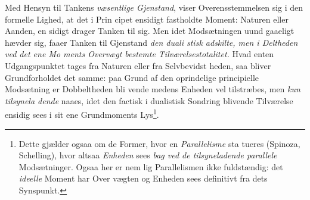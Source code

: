 Med Hensyn til Tankens \emph{væsentlige Gjenstand}, viser
Overensstemmelsen sig i den formelle Lighed, at det i Prin\-%
cipet ensidigt fastholdte Moment: Naturen eller Aanden, en\-%
sidigt drager Tanken til sig. Men idet Modsætningen uund\-%
gaaeligt hævder sig, faaer Tanken til Gjenstand \emph{den duali\-%
\setcounter{footnote}{0}%
stisk adskilte, men i Deltheden ved det ene Mo\-%
ments Overvægt bestemte Tilværelsestotalitet.} Hvad
enten Udgangspunktet tages fra Naturen eller fra Selvbevidst\-%
heden, saa bliver Grundforholdet det samme: paa Grund af
den oprindelige principielle Modsætning er Dobbeltheden bli\-%
vende medens Enheden vel tilstræbes, men \emph{kun tilsynela\-%
dende} naaes, idet den factisk i dualistisk Sondring blivende
Tilværelse ensidig sees i sit ene Grundmoments Lys\footnote{Dette gjælder ogsaa om de Former, hvor en \emph{Parallelisme} sta\-%
tueres (Spinoza, Schelling), hvor altsaa \emph{Enheden} sees \emph{bag ved
de tilsyneladende parallele} Modsætninger. Ogsaa her er nem\-%
lig Parallelismen ikke fuldstændig: det \emph{ideelle} Moment har Over\-%
vægten og Enheden sees definitivt fra dets Synspunkt.}.

